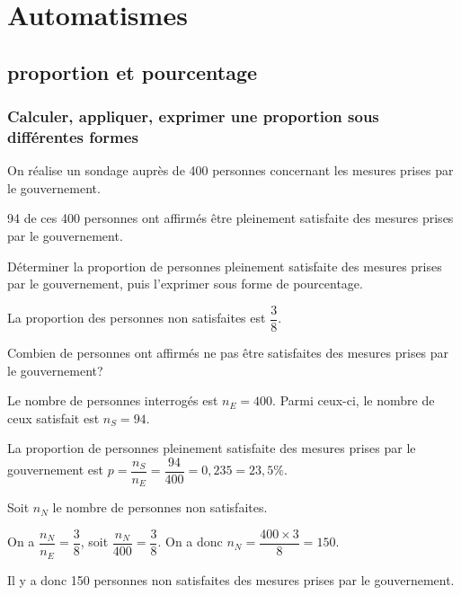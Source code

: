 \documentclass[11pt,a4paper]{book}
\begin{document}
\graphicspath{{images/}}
\chapter{Automatismes}
\thispagestyle{fancy}

\section{proportion et pourcentage}

\subsection{Calculer, appliquer, exprimer une proportion sous différentes formes}

\begin{bmethode}
    
    On réalise un sondage auprès de 400 personnes concernant les mesures prises par le gouvernement.
    \begin{enumMet}
        \item 94 de ces 400 personnes ont affirmés être pleinement satisfaite des mesures prises par le gouvernement.
        
        Déterminer la proportion de personnes pleinement satisfaite des mesures prises par le gouvernement, puis l'exprimer sous forme de pourcentage.
        \item La proportion des personnes non satisfaites est $\dfrac{3}{8}$.
        
        Combien de personnes ont affirmés ne pas être satisfaites des mesures prises par le gouvernement?
    \end{enumMet}
    
    \begin{enumMet}
        \item Le nombre de personnes interrogés est $n_E=400$. Parmi ceux-ci, le nombre de ceux satisfait est $n_S=94$.
        
        La proportion de personnes pleinement satisfaite des mesures prises par le gouvernement est $p=\dfrac{n_S}{n_E}=\dfrac{94}{400}=0,235=23,5\%$.
        \item Soit $n_N$ le nombre de personnes non satisfaites.
        
        On a $\dfrac{n_N}{n_E}=\dfrac{3}{8}$, soit $\dfrac{n_N}{400}=\dfrac{3}{8}$.
        On a donc $n_N=\dfrac{400\times 3}{8}=150$.
        
        Il y a donc 150 personnes non satisfaites des mesures prises par le gouvernement.
    \end{enumMet}
\end{bmethode}
\end{document}
